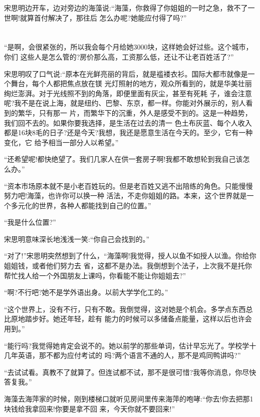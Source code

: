 \documentclass[11pt,a4paper,onecolumn]{article}
\begin{document}
宋思明边开车，边对旁边的海藻说:``海藻，你救得了你姐姐的一时之急，救不了一世啊!就算首付解决了，那往后
怎么办呢?她能应付得了吗?''

\section[\thesection]{} ``是啊，会很紧张的，所以我会每个月给她3000块，这样她会好过些。这个城市，你们
这些人是怎么管的?房价那么高，工资那么低，还让不让老百姓活了?''

宋思明叹了口气说:``原本在光鲜亮丽的背后，就是褴褛衣衫。国际大都市就像是一个舞台，每个人都把焦点放在镁
光灯照射的地方，观众所看到的，就是华美壮丽绚烂澎湃。对于光线照不到的角落，即便里面有灰尘，甚至有死耗
子，谁会注意呢?我不是在说上海，就是纽约、巴黎、东京，都一样。你能对外展示的，别人看到的繁华，只有那一
片，而繁华下的沉重，外人是感受不到的。这是一种趋势，我们回不去的。如果你要我选择，是生活在过去的清一
色土布灰蓝、每个人收入都是16块8毛的日子?还是今天?我想，我还是愿意生活在今天的。至少，它有一种变化，它
给予相当一部分人以希望。''

``还希望呢!都快绝望了。我们几家人在供一套房子啊!我都不敢想轮到我自己该怎么办。''

``资本市场原本就不是小老百姓玩的。但是老百姓又逃不出陪练的角色。只能慢慢努力吧!海藻，也许你可以换一种
活法，不走你姐姐的路。本来，这个世界就是一个多元化的世界，各种人都能找到自己的位置。''

``我是什么位置?''

宋思明意味深长地浅浅一笑:``你自己会找到的。''

``对了!''宋思明突然想到了什么，``海藻啊!我觉得，授人以鱼不如授人以渔。你给你姐姐钱，或者他们努力去
省，这都不是办法。我倒想到个法子，上次我不是托你帮忙找人给一个外国朋友上课吗，你看能不能让你姐姐去?''

``啊?不行吧?她不是学外语出身。以前大学学化工的。''

``这个世界上，没有不行，只有不敢。我倒觉得，这对她是个机会。多学点东西总比原地踏步好。她还年轻，趁有
能力的时候可以多储备点能量，这样以后也许会用到。''

``能行吗?我觉得她肯定会说不的。她以前学的那些单词，估计早忘光了。学校学十几年英语，那不都为应付考试的
吗?两个语言不通的人，那不是鸡同鸭讲吗?''

``去试试看。真教不了就算了。但连试都不试，那不是很可惜?我等你消息，你尽快答复我。''

海藻去海萍家的时候，刚到楼梯口就听见房间里传来海萍的咆哮:``你去!你去把那1块钱给我拿回来!你要是拿不回
来，今天你就不要回来!''
\end{document}
